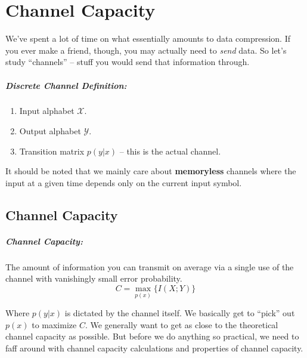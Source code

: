 \documentclass[a4paper,12pt]{report}
\begin{document}
\chapter{Channel Capacity}

We've spent a lot of time on what essentially amounts to data compression. If
you ever make a friend, though, you may actually need to \textit{send} data. So
let's study ``channels'' -- stuff you would send that information through.

\paragraph{Discrete Channel Definition: } 
\begin{enumerate}
\item Input alphabet $\mathcal X$. 
\item Output alphabet $\mathcal Y$.
\item Transition matrix $p(y | x)$ -- this is the actual channel. 
\end{enumerate}

It should be noted that we mainly care about \textbf{memoryless} channels where
the input at a given time depends only on the current input symbol. 


\section{Channel Capacity} 

\paragraph{Channel Capacity: } The amount of information you can transmit on
average via a single use of the channel with vanishingly small error
probability.
\begin{equation}
	C = \max_{p(x)}\{I(X; Y)\}
\end{equation}

Where $p(y | x)$ is dictated by the channel itself. We basically get to ``pick''
out $p(x)$ to maximize $C$. We generally want to get as close to the theoretical
channel capacity as possible. But before we do anything so practical, we need to
faff around with channel capacity calculations and properties of channel
capacity.
\end{document}

